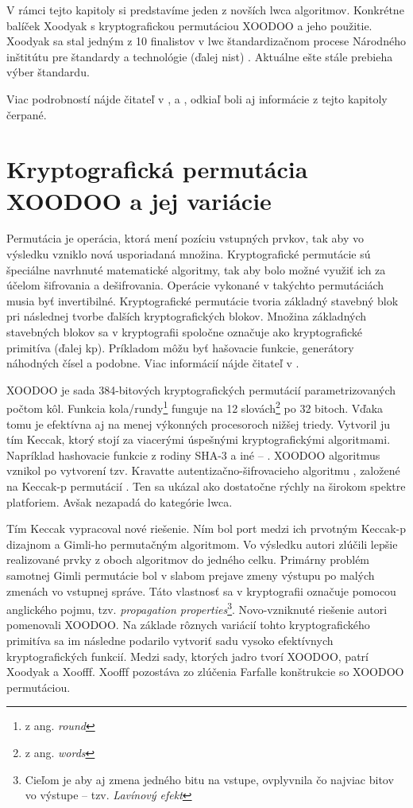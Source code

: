 V rámci tejto kapitoly si predstavíme jeden z novších \acrshort{lwca} algoritmov. Konkrétne balíček Xoodyak s kryptografickou permutáciou XOODOO \cite{tkecak} a jeho použitie. Xoodyak sa stal jedným z 10 finalistov v \acrshort{lwc} štandardizačnom procese Národného inštitútu pre štandardy a technológie (ďalej \acrshort{nist}) \cite{lwc3}. Aktuálne ešte stále prebieha výber štandardu.

Viac podrobností nájde čitateľ v \cite{lwc}, \cite{lwc2} a \cite{lwc3}, odkiaľ boli aj informácie z tejto kapitoly čerpané. 
        
\section{Kryptografická permutácia XOODOO a jej variácie}
Permutácia je operácia, ktorá mení pozíciu vstupných prvkov, tak aby vo výsledku vzniklo nová usporiadaná množina. Kryptografické permutácie sú špeciálne navrhnuté matematické algoritmy, tak aby bolo možné využiť ich za účelom šifrovania a dešifrovania. Operácie vykonané v takýchto permutáciách musia byť invertibilné. Kryptografické permutácie tvoria základný stavebný blok pri následnej tvorbe ďalších kryptografických blokov. Množina základných stavebných blokov sa v kryptografii spoločne označuje ako kryptografické primitíva (ďalej \acrshort{kp}). Príkladom môžu byť hašovacie funkcie, generátory náhodných čísel a podobne. Viac informácií nájde čitateľ v \cite{kp}.  
 
XOODOO je sada 384-bitových kryptografických permutácií parametrizovaných počtom kôl. Funkcia kola/rundy\footnote{z ang. \textit{round}} funguje na 12 slovách\footnote{z ang. \textit{words}} po 32 bitoch. Vďaka tomu je efektívna aj na menej výkonných procesoroch nižšej triedy. Vytvoril ju tím Keccak, ktorý stojí za viacerými úspešnými kryptografickými algoritmami. Napríklad hashovacie funkcie z rodiny SHA-3 a iné -- \cite{kecsup}. XOODOO algoritmus vznikol po vytvorení tzv. Kravatte autentizačno-šifrovacieho algoritmu \cite{kravatte}, založené na Keccak-p permutácií \cite{keccakp}. Ten sa ukázal ako dostatočne rýchly na širokom spektre platforiem. Avšak nezapadá do kategórie \acrshort{lwca}.

Tím Keccak vypracoval nové riešenie. Ním bol port medzi ich prvotným Keccak-p dizajnom a Gimli-ho \cite{bernstein2017gimli} permutačným algoritmom. Vo výsledku autori zlúčili lepšie realizované prvky z oboch algoritmov do jedného celku. Primárny problém samotnej Gimli permutácie bol v slabom prejave zmeny výstupu po malých zmenách vo vstupnej správe. Táto vlastnosť sa v kryptografii označuje pomocou anglického pojmu, tzv. \textit{propagation properties}\footnote{Cieľom je aby aj zmena jedného bitu na vstupe, ovplyvnila čo najviac bitov vo výstupe -- tzv. \textit{Lavínový efekt}}. Novo-vzniknuté riešenie autori pomenovali XOODOO. Na základe rôznych variácií tohto kryptografického primitíva sa im následne podarilo vytvoriť sadu vysoko efektívnych kryptografických funkcií. 
Medzi sady, ktorých jadro tvorí XOODOO, patrí Xoodyak a Xoofff. Xoofff pozostáva zo zlúčenia Farfalle konštrukcie \cite{farfalle} so XOODOO permutáciou. 

